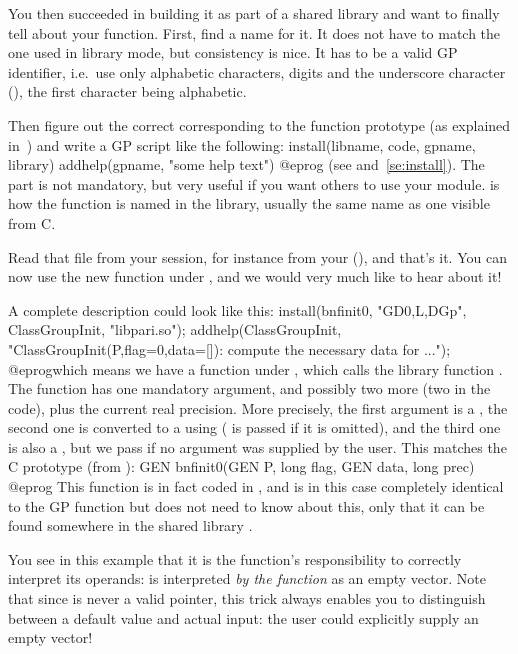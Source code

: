You then succeeded in building it as part of a shared library and want to
finally tell  about your function. First, find a name for it. It does
not have to match the one used in library mode, but consistency is nice. It
has to be a valid GP identifier, i.e.~use only alphabetic characters, digits
and the underscore character (\kbd{\_}), the first character being
alphabetic.

Then figure out the correct  corresponding to the function
prototype (as explained in~) and write a GP script
like the following:
\bprog
install(libname, code, gpname, library)
addhelp(gpname, "some help text")
@eprog
\noindent(see  and~\ref{se:install}). The 
part is not mandatory, but very useful if you want others to use your
module.  is how the function is named in the library,
usually the same name as one visible from C.

Read that file from your  session, for instance from your
 (), and that's it. You
can now use the new function  under , and we would very
much like to hear about it! \smallskip

A complete description could look like this:
\bprog
{
  install(bnfinit0, "GD0,L,DGp", ClassGroupInit, "libpari.so");
  addhelp(ClassGroupInit, "ClassGroupInit(P,{flag=0},{data=[]}):
    compute the necessary data for ...");
}
@eprog\noindent which means we have a function  under
, which calls the library function  . The function has
one mandatory argument, and possibly two more (two  in the code),
plus the current real precision. More precisely, the first argument is a
, the second one is converted to a  using 
( is passed if it is omitted), and the third one is also a ,
but we pass  if no argument was supplied by the user. This matches
the C prototype (from ):
%
\bprog
  GEN bnfinit0(GEN P, long flag, GEN data, long prec)
@eprog\noindent
This function is in fact coded in , and is in this case
completely identical to the GP function  but  does not
need to know about this, only that it can be found somewhere in the shared
library .

 You see in this example that it is the
function's responsibility to correctly interpret its operands:  is interpreted \emph{by the function} as an empty vector. Note that
since  is never a valid  pointer, this trick always
enables you to distinguish between a default value and actual input: the
user could explicitly supply an empty vector!

